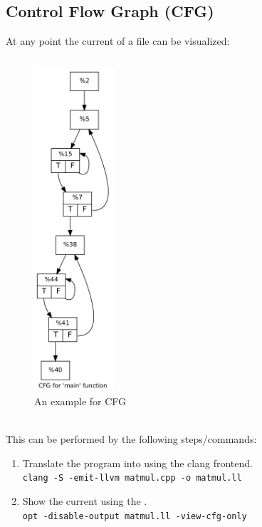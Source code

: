 \subsection{Control Flow Graph (CFG)}
At any point the current \cfg of a \llvmir file can be visualized:
\begin{figure}[!ht]
    \caption{An example for CFG}
    \label{fig:examplePipeline}
    \begin{minipage}{.7\textwidth}
        \inputminted{c++}{cpp/matmul.cpp}
    \end{minipage}
    \begin{minipage}{.2\textwidth}
        \includegraphics[height=12cm]{gfx/matmulCfg.png}
    \end{minipage}
\end{figure}\\
This can be performed by the following steps/commands:
\begin{enumerate}
    \item Translate the program into \llvmir using the clang frontend.\\
        \texttt{clang -S -emit-llvm matmul.cpp -o matmul.ll}
    \item Show the current \cfg using the \opt.\\
        \texttt{opt -disable-output matmul.ll -view-cfg-only}
\end{enumerate}
